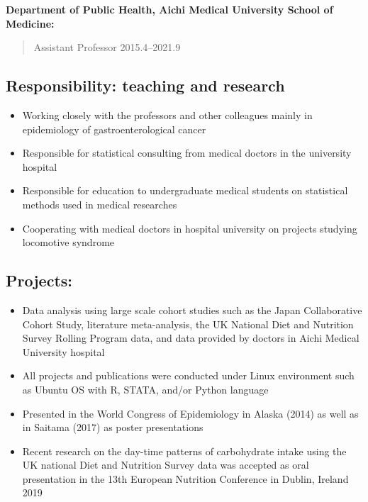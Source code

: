 \documentclass[10pt,]{article}
\providecommand{\tightlist}{%
  \setlength{\itemsep}{0pt}\setlength{\parskip}{0pt}}
\begin{document}
\textbf{Department of Public Health, Aichi Medical University School of
Medicine:}

\begin{quote}
Assistant Professor \hfill 2015.4--2021.9
\end{quote}

\hypertarget{responsibility-teaching-and-research}{%
\subsection{Responsibility: teaching and
research}\label{responsibility-teaching-and-research}}

\begin{itemize}
\tightlist
\item
  Working closely with the professors and other colleagues mainly in
  epidemiology of gastroenterological cancer
\item
  Responsible for statistical consulting from medical doctors in the
  university hospital
\item
  Responsible for education to undergraduate medical students on
  statistical methods used in medical researches
\item
  Cooperating with medical doctors in hospital university on projects
  studying locomotive syndrome
\end{itemize}

\hypertarget{projects}{%
\subsection{Projects:}\label{projects}}

\begin{itemize}
\tightlist
\item
  Data analysis using large scale cohort studies such as the Japan
  Collaborative Cohort Study, literature meta-analysis, the UK National
  Diet and Nutrition Survey Rolling Program data, and data provided by
  doctors in Aichi Medical University hospital
\item
  All projects and publications were conducted under Linux environment
  such as Ubuntu OS with R, STATA, and/or Python language
\item
  Presented in the World Congress of Epidemiology in Alaska (2014) as
  well as in Saitama (2017) as poster presentations
\item
  Recent research on the day-time patterns of carbohydrate intake using
  the UK national Diet and Nutrition Survey data was accepted as oral
  presentation in the 13th European Nutrition Conference in Dublin,
  Ireland 2019
\end{itemize}
\end{document}
